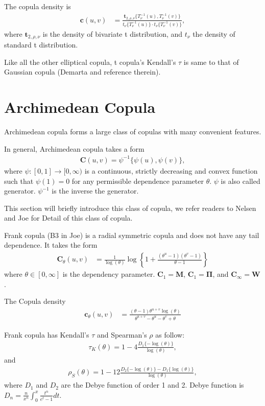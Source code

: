 \documentclass[square]{article} %
\begin{document}
    The copula density is
    \begin{align}
        \bm{c}(u,v) &= \frac{\bm{t}_{2, \rho, \nu}\{T^{-1}_\nu(u), T^{-1}_\nu(v)\}}
        {t_\nu\{T^{-1}_\nu(u)\}\cdot t_\nu\{T^{-1}_\nu(v)\}},
        \end{align}
    where $\bm{t}_{2,\rho, \nu}$ is the density of bivariate t distribution,
    and $t_\nu$ the density of standard t distribution.

    Like all the other elliptical copula, t copula's Kendall's $\tau$ is same to that of Gaussian copula (Demarta and reference therein).

    \section{Archimedean Copula}\label{sec:archimedean-copula}
    Archimedean copula forms a large class of copulas with many convenient features.

    In general, Archimedean copula takes a form
    \begin{align}
        \bm{C}(u,v)= \psi^{-1}\{\psi(u), \psi(v)\},
        \end{align}
    where $\psi:[0,1] \rightarrow [0,\infty)$ is a continuous, strictly decreasing and convex function such that
    $\psi(1)=0$ for any permissible dependence parameter $\theta$. $\psi$ is also called generator.
    $\psi^{-1}$ is the inverse the generator.

    This section will briefly introduce this class of copula,
    we refer readers to Nelsen and Joe for Detail of this class of copula.

    Frank copula (B3 in Joe) is a radial symmetric copula and does not have any tail dependence.
    It takes the form
    \begin{align}
        \bm{C}_{\theta}(u,v) &= \frac{1}{\log(\theta)}
        \log \left\{
        1 + \frac{(\theta^u-1)(\theta^v-1)}{\theta-1}
        \right\}
        \end{align}
    where $\theta \in [0, \infty]$ is the dependency parameter.
    $\bm{C}_1 = \bm{M}$, $\bm{C}_1 = \bm{\Pi}$, and $\bm{C}_\infty = \bm{W}$.

    The Copula density
    \begin{align}
        \bm{c}_{\theta}(u,v) &= \frac{(\theta-1)\theta^{u+v}\log(\theta)}
        {\theta^{u+v}-\theta^u-\theta^v+\theta}
        \end{align}

    Frank copula has Kendall's $\tau$ and Spearman's $\rho$ as follow:
    \begin{align}
        \tau_K(\theta) = 1-4\frac{D_1\{-\log(\theta)\}}{\log(\theta)},
        \end{align}
and
    \begin{align}
        \rho_S(\theta) = 1-12\frac{D_2\{-\log(\theta)\} - D_1\{\log(\theta)\}}{\log(\theta)},
        \end{align}
    where $D_1$ and $D_2$ are the Debye function of order 1 and 2.
    Debye function is $D_n = \frac{n}{x^n}\int_0^x\frac{t^n}{e^t-1}dt$.
\end{document}

